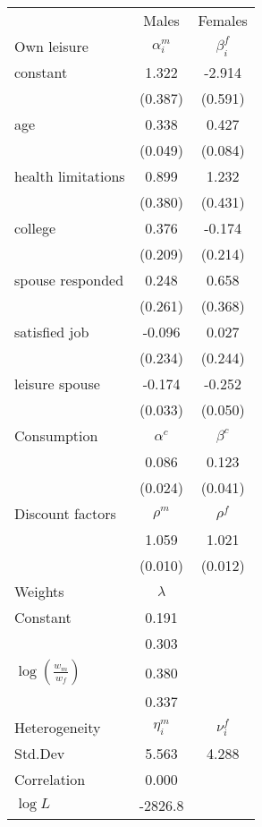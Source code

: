 \begin{tabular}{lcc} 
\hline\hline 
 & Males & Females \\ 
Own leisure & $\alpha_{i}^{m}$ & $\beta_{i}^{f}$ \\ 
constant & 1.322 & -2.914 \\ 
 & (0.387) & (0.591) \\ 
age & 0.338 & 0.427 \\ 
 & (0.049) & (0.084) \\ 
health limitations & 0.899 & 1.232 \\ 
 & (0.380) & (0.431) \\ 
college & 0.376 & -0.174 \\ 
 & (0.209) & (0.214) \\ 
spouse responded & 0.248 & 0.658 \\ 
 & (0.261) & (0.368) \\ 
satisfied job & -0.096 & 0.027 \\ 
 & (0.234) & (0.244) \\ 
leisure spouse & -0.174 & -0.252 \\ 
 & (0.033) & (0.050) \\ 
Consumption & $\alpha^{c}$ & $\beta^{c}$ \\ 
 & 0.086 & 0.123 \\ 
 & (0.024) & (0.041) \\ 
Discount factors & $\rho^m$ & $\rho^f$ \\ 
 & 1.059 & 1.021 \\ 
 & (0.010) & (0.012) \\ 
Weights & $\lambda$ &  \\ 
Constant & 0.191 &  \\ 
 & 0.303 &  \\ 
$\log(\frac{w_m}{w_f})$ & 0.380 &  \\ 
 & 0.337 &  \\ 
Heterogeneity & $\eta_i^m$ & $\nu_i^f$ \\ 
Std.Dev & 5.563 & 4.288 \\ 
Correlation & 0.000 &  \\ 
\hline 
$\log L$ & -2826.8 & \\ 
\hline \hline 
\end{tabular} 

